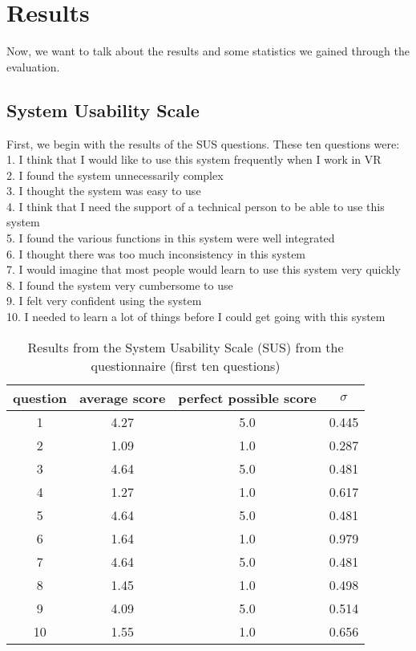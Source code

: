 \section{Results}
Now, we want to talk about the results and some statistics we gained through the evaluation.\\

\subsection{System Usability Scale}
First, we begin with the results of the SUS questions. These ten questions were:\\
1. I think that I would like to use this system frequently when I work in VR\\
2. I found the system unnecessarily complex\\
3. I thought the system was easy to use \\
4. I think that I need the support of a technical person to be able to use this system\\
5. I found the various functions in this system were well integrated\\
6. I thought there was too much inconsistency in this system\\
7. I would imagine that most people would learn to use this system very quickly\\
8. I found the system very cumbersome to use\\
9. I felt very confident using the system\\
10. I needed to learn a lot of things before I could get going with this system
\iffalse
\begin{table}[ht!]
    \centering
    \caption{Results from the System Usability Scale (SUS) from the questionnaire (first ten questions)}
    \begin{tabular}{cccc} \toprule
        question&average score&perfect possible score&$\sigma$\\ \midrule
        1 & 4.27 & 5.0 & 0.445\\ 
        2 & 1.09 & 1.0 & 0.287\\
        3 & 4.64 & 5.0 & 0.481\\ 
        4 & 1.27 & 1.0 & 0.617\\
        5 & 4.64 & 5.0 & 0.481\\
        6 & 1.64 & 1.0 & 0.979\\
        7 & 4.64 & 5.0 & 0.481\\
        8 & 1.45 & 1.0 & 0.498\\
        9 & 4.09 & 5.0 & 0.514\\
        10 & 1.55 & 1.0 & 0.656\\
        \bottomrule
    \end{tabular}
    \label{tab:table}
\end{table}
